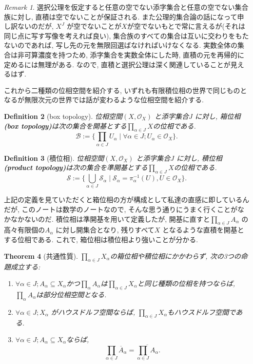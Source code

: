 \documentclass[lualatex]{ltjsbook}
\newcommand{\cl}[1]{\overline{ #1}  }
\newtheorem{theorem}{Theorem}[section]
\newtheorem{definition}[theorem]{Definition}
\theoremstyle{remark}
\newtheorem{remark}[theorem]{Remark}
\theoremstyle{plain}
\begin{document}
\begin{remark}
選択公理を仮定すると任意の空でない添字集合と任意の空でない集合族に対し, 直積は空でないことが保証される. また公理的集合論の話になって申し訳ないのだが, $X^J$ が空でないことが$X$が空でないもとで常に言えるが(それは同じ点に写す写像を考えれば良い), 集合族のすべての集合は互いに交わりをもたないのであれば, 写し先の元を無限回選ばなければいけなくなる. 実数全体の集合は非可算濃度を持つため, 添字集合を実数全体にした時, 直積の元を再帰的に定めるには無理がある. なので, 直積と選択公理は深く関連していることが見えるはず.
\end{remark}

これから二種類の位相空間を紹介する, いずれも有限積位相の世界で同じものとなるが無限次元の世界では話が変わるような位相空間を紹介する.

\begin{definition}[box topology]
	位相空間$\left( X,\mathcal{O}_X \right) $ と添字集合$J$ に対し, 箱位相 \textbf{(box topology)}は次の集合を開基とする$\prod_{\alpha \in J}X$の位相である. 
	 \[
	\mathcal{B}:=\{\prod_{\alpha \in J}U_{\alpha}  \mid \forall \alpha \in J; U_{\alpha} \in \mathcal{O}_X\} 
	.\] 
\end{definition}

\begin{definition}[積位相]

	位相空間$\left( X,\mathcal{O}_X \right) $ と添字集合$J$ に対し, 積位相 \textbf{(product topology)}は次の集合を準開基とする$\prod_{\alpha \in J}X$の位相である. 
	\[
	\mathcal{S}:=\{\bigcup_{\alpha \in J}\mathcal{S}_{\alpha} \mid \mathcal{S}_{\alpha}= \pi_{\alpha}^{-1} \left( U \right)  , U \in \mathcal{O}_X \} 
	.\] 
\end{definition}

上記の定義を見ていただくと箱位相の方が構成として私達の直感に即しているんだが, このノートは数学のノートなので, そんな思う通りにうまく行くことがなかなかないのだ.
積位相は準開基を用いて定義したが, 開基に直すと$\prod_{\alpha \in J} A_{\alpha}  $ の高々有限個の$A_{\alpha}$ に対し開集合となり, 残りすべて$X$ となるような直積を開基とする位相である. 
これで, 箱位相は積位相より強いことが分かる. 

\begin{theorem}[共通性質]
	$\prod_{\alpha \in J} X_{\alpha}  $の箱位相や積位相にかかわらず, 次の3つの命題成立する:
	\begin{enumerate}
		\item $\forall \alpha \in J; A_{\alpha} \subseteq X_{\alpha} $かつ$\prod_{\alpha} A_{\alpha}  $は$\prod_{\alpha \in J} X_{\alpha}  $と同じ種類の位相を持つならば, $\prod_{\alpha} A_{\alpha}  $は部分位相空間となる.
		\item $\forall \alpha \in J; X_{\alpha}$ がハウスドルフ空間ならば, $\prod_{\alpha \in J} X_{\alpha}  $もハウスドルフ空間である.
		\item $\forall \alpha \in J; A_{\alpha} \subseteq X_{\alpha}$ならば, 
			\[
			\prod_{\alpha \in J} \cl{A}_{\alpha} = \cl{\prod_{\alpha \in J} A_{\alpha}}    
			.\] 
	\end{enumerate}
\end{theorem}
\end{document}
